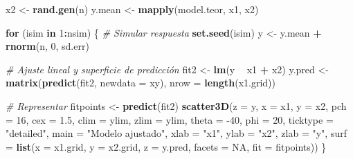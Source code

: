 \documentclass[
  spanish,
]{book}
\newenvironment{Shaded}{\begin{snugshade}}{\end{snugshade}}
\newcommand{\CommentTok}[1]{\textcolor[rgb]{0.56,0.35,0.01}{\textit{#1}}}
\newcommand{\ControlFlowTok}[1]{\textcolor[rgb]{0.13,0.29,0.53}{\textbf{#1}}}
\newcommand{\DataTypeTok}[1]{\textcolor[rgb]{0.13,0.29,0.53}{#1}}
\newcommand{\DecValTok}[1]{\textcolor[rgb]{0.00,0.00,0.81}{#1}}
\newcommand{\FloatTok}[1]{\textcolor[rgb]{0.00,0.00,0.81}{#1}}
\newcommand{\KeywordTok}[1]{\textcolor[rgb]{0.13,0.29,0.53}{\textbf{#1}}}
\newcommand{\NormalTok}[1]{#1}
\newcommand{\OperatorTok}[1]{\textcolor[rgb]{0.81,0.36,0.00}{\textbf{#1}}}
\newcommand{\OtherTok}[1]{\textcolor[rgb]{0.56,0.35,0.01}{#1}}
\newcommand{\StringTok}[1]{\textcolor[rgb]{0.31,0.60,0.02}{#1}}
\theoremstyle{break}
\theoremstyle{definition}
\theoremstyle{definition}
\theoremstyle{definition}
\theoremstyle{remark}
\begin{document}
\begin{Shaded}
\begin{Highlighting}[]
\NormalTok{x2 <-}\StringTok{ }\KeywordTok{rand.gen}\NormalTok{(n)}
\NormalTok{y.mean <-}\StringTok{ }\KeywordTok{mapply}\NormalTok{(model.teor, x1, x2)}

\ControlFlowTok{for}\NormalTok{ (isim }\ControlFlowTok{in} \DecValTok{1}\OperatorTok{:}\NormalTok{nsim) \{}
  \CommentTok{# Simular respuesta}
  \KeywordTok{set.seed}\NormalTok{(isim)}
\NormalTok{  y <-}\StringTok{ }\NormalTok{y.mean }\OperatorTok{+}\StringTok{ }\KeywordTok{rnorm}\NormalTok{(n, }\DecValTok{0}\NormalTok{, sd.err)}
  
  \CommentTok{# Ajuste lineal y superficie de predicción}
\NormalTok{  fit2 <-}\StringTok{ }\KeywordTok{lm}\NormalTok{(y }\OperatorTok{~}\StringTok{ }\NormalTok{x1 }\OperatorTok{+}\StringTok{ }\NormalTok{x2)}
\NormalTok{  y.pred <-}\StringTok{ }\KeywordTok{matrix}\NormalTok{(}\KeywordTok{predict}\NormalTok{(fit2, }\DataTypeTok{newdata =}\NormalTok{ xy), }\DataTypeTok{nrow =} \KeywordTok{length}\NormalTok{(x1.grid)) }
  
  \CommentTok{# Representar}
\NormalTok{  fitpoints <-}\StringTok{ }\KeywordTok{predict}\NormalTok{(fit2) }
  \KeywordTok{scatter3D}\NormalTok{(}\DataTypeTok{z =}\NormalTok{ y, }\DataTypeTok{x =}\NormalTok{ x1, }\DataTypeTok{y =}\NormalTok{ x2, }\DataTypeTok{pch =} \DecValTok{16}\NormalTok{, }\DataTypeTok{cex =} \FloatTok{1.5}\NormalTok{, }\DataTypeTok{clim =}\NormalTok{ ylim, }\DataTypeTok{zlim =}\NormalTok{ ylim,}
            \DataTypeTok{theta =} \DecValTok{-40}\NormalTok{, }\DataTypeTok{phi =} \DecValTok{20}\NormalTok{, }\DataTypeTok{ticktype =} \StringTok{"detailed"}\NormalTok{, }
            \DataTypeTok{main =} \StringTok{"Modelo ajustado"}\NormalTok{, }\DataTypeTok{xlab =} \StringTok{"x1"}\NormalTok{, }\DataTypeTok{ylab =} \StringTok{"x2"}\NormalTok{, }\DataTypeTok{zlab =} \StringTok{"y"}\NormalTok{, }
            \DataTypeTok{surf =} \KeywordTok{list}\NormalTok{(}\DataTypeTok{x =}\NormalTok{ x1.grid, }\DataTypeTok{y =}\NormalTok{ x2.grid, }\DataTypeTok{z =}\NormalTok{ y.pred, }
                        \DataTypeTok{facets =} \OtherTok{NA}\NormalTok{, }\DataTypeTok{fit =}\NormalTok{ fitpoints))}
\NormalTok{\}}
\end{Highlighting}
\end{Shaded}
\end{document}
